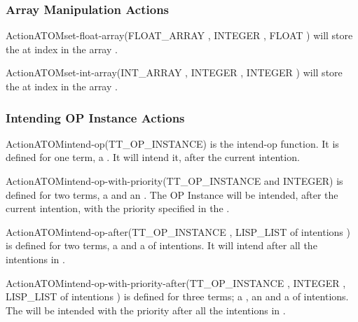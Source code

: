 \subsubsection{Array Manipulation Actions}

\begin{typeefa}{Action}{ATOM}{set-float-array}{(FLOAT\_ARRAY ,
INTEGER , FLOAT )}
will store the   at index  in the array
.
\end{typeefa}

\begin{typeefa}{Action}{ATOM}{set-int-array}{(INT\_ARRAY ,
INTEGER , INTEGER )}
will store the   at index  in the array
.
\end{typeefa}

\subsubsection{Intending OP Instance Actions}

\begin{typeefa}{Action}{ATOM}{intend-op}{(TT\_OP\_INSTANCE)}
is the intend-op function. It is defined for one term, a . It will intend it, after the current intention.
\end{typeefa}

\begin{typeefa}{Action}{ATOM}{intend-op-with-priority}{(TT\_OP\_INSTANCE and INTEGER)}
is defined for two terms, a  and an . The OP
Instance will be intended, after the current intention, with the priority
specified in the .
\end{typeefa}

\begin{typeefa}{Action}{ATOM}{intend-op-after}{(TT\_OP\_INSTANCE , LISP\_LIST of intentions )}
is defined for two terms, a  and a  of
intentions. It will intend  after all the intentions in
.
\end{typeefa}

\begin{typeefa}{Action}{ATOM}{intend-op-with-priority-after}{(TT\_OP\_INSTANCE , INTEGER , LISP\_LIST of intentions )}
is defined for three terms;  a ,
 an  and  a   of intentions. The
 will be  intended with the priority  after all the
intentions in .
\end{typeefa}

